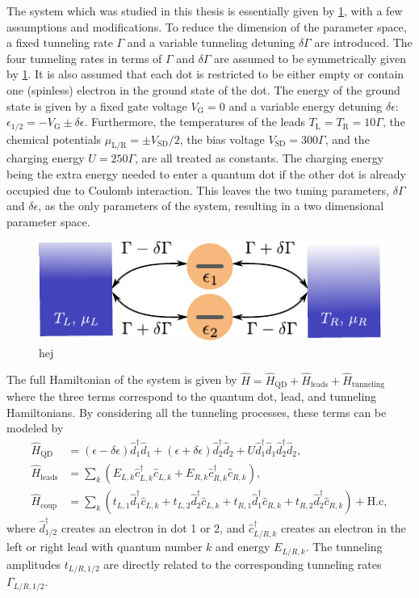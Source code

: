 \documentclass[../main.tex]{subfiles}
\begin{document}
The system which was studied in this thesis is essentially given by \cref{fig:model}, with a few assumptions and modifications. To reduce the dimension of the parameter space, a fixed tunneling rate $\Gamma$ and a variable tunneling detuning $\delta\Gamma$ are introduced. The four tunneling rates in terms of $\Gamma$ and $\delta\Gamma$ are assumed to be symmetrically given by \cref{fig:model}. It is also assumed that each dot is restricted to be either empty or contain one (spinless) electron in the ground state of the dot. The energy of the ground state is given by a fixed gate voltage $V_\text{G}=0$ and a variable energy detuning $\delta\epsilon$: $\epsilon_{1/2} = -V_\text{G} \pm \delta\epsilon$. Furthermore, the temperatures of the leads $T_\text{L}=T_\text{R}=10\Gamma$, the chemical potentials $\mu_\text{L/R} = \pm V_\text{SD}/2$, the bias voltage $V_\text{SD} = 300\Gamma$, and the charging energy $U = 250\Gamma$, are all treated as constants. The charging energy being the extra energy needed to enter a quantum dot if the other dot is already occupied due to Coulomb interaction. This leaves the two tuning parameters, $\delta\Gamma$ and $\delta\epsilon$, as the only parameters of the system, resulting in a two dimensional parameter space. 

\begin{figure}[H]
    \centering
    \includegraphics[width=0.8\linewidth]{figures/model.pdf}
    \caption{hej}
    \label{fig:model}
\end{figure}

The full Hamiltonian of the system is given by $\hat H = \hat H_\text{QD} + \hat H_\text{leads} + \hat H_\text{tunneling}$ where the three terms correspond to the quantum dot, lead, and tunneling Hamiltonians. By considering all the tunneling processes, these terms can be modeled by
\begin{equation}
    \begin{aligned}
        \hat H_\text{QD} &= (\epsilon - \delta\epsilon) \hat d_1^\dag \hat d_1  +  (\epsilon + \delta\epsilon)\hat d_2^\dag \hat d_2 + U\hat d_1^\dag \hat d_1 \hat d_2^\dag \hat d_2, \\
        \hat H_\text{leads} &= \sum_{k} (E_{L,k} \hat c_{L,k}^\dag \hat c_{L,k}  + E_{R,k} \hat c_{R,k}^\dag \hat c_{R,k}), \\
        \hat H_\text{coup} &= \sum_k (t_{L,1} \hat d_1^\dag \hat c_{L,k} + t_{L,2} \hat d_2^\dag \hat c_{L,k} + t_{R,1} \hat d_1^\dag \hat c_{R,k} + t_{R,2} \hat d_2^\dag \hat c_{R,k}) + \text{H.c},
    \end{aligned}
\end{equation}
where $\hat d_{1/2}^\dag$ creates an electron in dot 1 or 2, and $\hat c_{L/R,k}^\dag$ creates an electron in the left or right lead with quantum number $k$ and energy $E_{L/R,k}$. The tunneling amplitudes $t_{L/R,1/2}$ are directly related to the corresponding tunneling rates $\Gamma_{L/R,1/2}$. 
\end{document}
